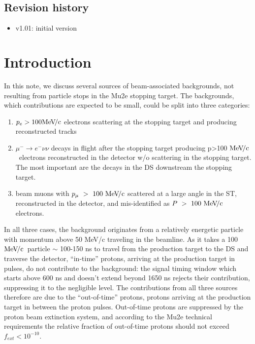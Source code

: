 \documentclass[12pt]{article}
\newcommand {\MeVc}       {\mbox{$\rm MeV\!/c$}}
\newcommand {\ra}        {\rightarrow}
\begin{document}
\subsection {Revision history} 
\begin{itemize}
\item
  v1.01: initial version
\end{itemize}

\section {Introduction}

In this note, we discuss several sources of beam-associated backgrounds,
not resulting from particle stops in the Mu2e stopping target. 
The backgrounds, which contributions are expected to be small,
could be split into three categories:

\begin{enumerate}
\item 
  $p_e > 100 \MeVc$ electrons scattering at the stopping target and producing reconstructed tracks
\item
  $\mu^- \ra e^- \nu \nu$ decays in flight after the stopping target producing p>100 \MeVc\
  electrons reconstructed in the detector w/o scattering in the stopping target.
  The most important are the decays in the DS downstream the stopping target.
\item
  beam muons with  $p_\mu ~> ~100 ~\MeVc$ scattered at a large angle in the ST,
  reconstructed in the detector, and mis-identified as $P ~>~ 100 ~\MeVc$ electrons.
\end{enumerate}

In all three cases, the background originates from a relatively energetic particle with momentum
above 50 MeV/c traveling in the beamline. 
As it takes a 100 \MeVc\ particle $\sim$  100-150 ns to travel from the production target
to the DS and traverse the detector, ``in-time'' protons, arriving at the production target
in pulses, do not contribute to the background: the signal timing window which starts
above 600 ns and doesn't extend beyond 1650 ns rejects their contribution, suppressing
it to the negligible level. The contributions from all three sources therefore are due
to the ``out-of-time'' protons, protons arriving at the production target in between
the proton pulses. Out-of-time protons are suppressed by the proton beam extinction system,
and according to the Mu2e technical requirements the relative fraction of out-of-time protons
should not exceed $f_{ext} < 10^{-10}$.
\end{document}
